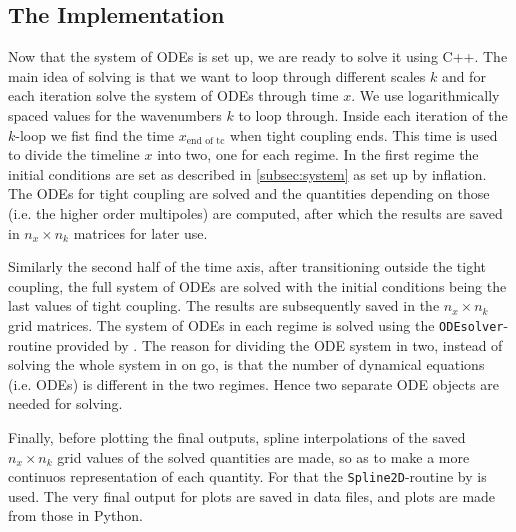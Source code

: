 \documentclass[twocolumn]{aastex62}
\begin{document}
\subsection{The Implementation} \label{subsec:implementation}
Now that the system of ODEs is set up, we are ready to solve it using C++. The main idea of solving is that we want to loop through different scales $k$ and for each iteration solve the system of ODEs through time $x$. We use logarithmically spaced values for the wavenumbers $k$ to loop through. Inside each iteration of the $k$-loop we fist find the time $x_\text{end of tc}$ when tight coupling ends. This time is used to divide the timeline $x$ into two, one for each regime. In the first regime the initial conditions are set as described in \ref{subsec:system} as set up by inflation. The ODEs for tight coupling are solved and the quantities depending on those (i.e. the higher order multipoles) are computed, after which the results are saved in $n_x\times n_k$ matrices for later use.

Similarly the second half of the time axis, after transitioning outside the tight coupling, the full system of ODEs are solved with the initial conditions being the last values of tight coupling. The results are subsequently saved in the $n_x\times n_k$ grid matrices. The system of ODEs in each regime is solved using the \texttt{ODEsolver}-routine provided by \cite{winther:2020b}. The reason for dividing the ODE system in two, instead of solving the whole system in on go, is that the number of dynamical equations (i.e. ODEs) is different in the two regimes. Hence two separate ODE objects are needed for solving. 

Finally, before plotting the final outputs, spline interpolations of the saved $n_x\times n_k$ grid values of the solved quantities are made, so as to make a more continuos representation of each quantity. For that the \texttt{Spline2D}-routine by \cite{winther:2020b} is used. The very final output for plots are saved in data files, and plots are made from those in Python.
\end{document}
